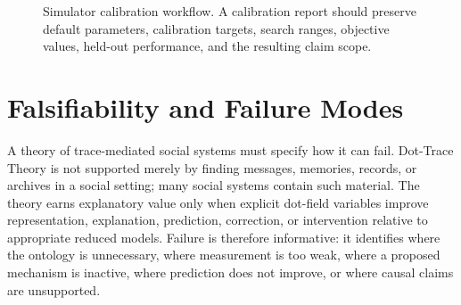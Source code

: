\documentclass[11pt]{article}
\theoremstyle{remark}
\begin{document}
\begin{figure}[htbp]
\centering
{}
\caption{Simulator calibration workflow. A calibration report should preserve default parameters, calibration targets, search ranges, objective values, held-out performance, and the resulting claim scope.}
\label{fig:calibration-workflow}
\end{figure}



\section{Falsifiability and Failure Modes}\label{falsifiability-failure-modes}

A theory of trace-mediated social systems must specify how it can fail. Dot-Trace Theory is not supported merely by finding messages, memories, records, or archives in a social setting; many social systems contain such material. The theory earns explanatory value only when explicit dot-field variables improve representation, explanation, prediction, correction, or intervention relative to appropriate reduced models. Failure is therefore informative: it identifies where the ontology is unnecessary, where measurement is too weak, where a proposed mechanism is inactive, where prediction does not improve, or where causal claims are unsupported.
\end{document}
